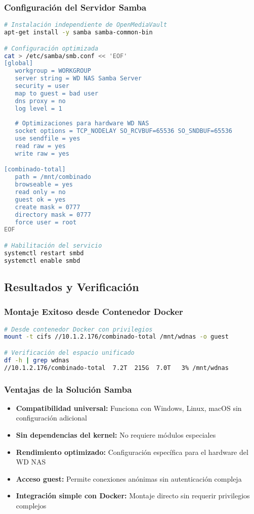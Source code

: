 \documentclass[12pt, a4paper]{article}
\begin{document}
\subsubsection{Configuración del Servidor Samba}
\begin{lstlisting}[language=bash, caption=Configuración Samba optimizada para WD NAS]
# Instalación independiente de OpenMediaVault
apt-get install -y samba samba-common-bin

# Configuración optimizada
cat > /etc/samba/smb.conf << 'EOF'
[global]
   workgroup = WORKGROUP
   server string = WD NAS Samba Server
   security = user
   map to guest = bad user
   dns proxy = no
   log level = 1
   
   # Optimizaciones para hardware WD NAS
   socket options = TCP_NODELAY SO_RCVBUF=65536 SO_SNDBUF=65536
   use sendfile = yes
   read raw = yes
   write raw = yes

[combinado-total]
   path = /mnt/combinado
   browseable = yes
   read only = no
   guest ok = yes
   create mask = 0777
   directory mask = 0777
   force user = root
EOF

# Habilitación del servicio
systemctl restart smbd
systemctl enable smbd
\end{lstlisting}

\subsection{Resultados y Verificación}
\label{subsec:resultados_samba}

\subsubsection{Montaje Exitoso desde Contenedor Docker}
\begin{lstlisting}[language=bash, caption=Acceso exitoso al filesystem de 7.2TB]
# Desde contenedor Docker con privilegios
mount -t cifs //10.1.2.176/combinado-total /mnt/wdnas -o guest

# Verificación del espacio unificado
df -h | grep wdnas
//10.1.2.176/combinado-total  7.2T  215G  7.0T   3% /mnt/wdnas
\end{lstlisting}

\subsubsection{Ventajas de la Solución Samba}
\begin{itemize}
    \item \textbf{Compatibilidad universal:} Funciona con Windows, Linux, macOS sin configuración adicional
    \item \textbf{Sin dependencias del kernel:} No requiere módulos especiales
    \item \textbf{Rendimiento optimizado:} Configuración específica para el hardware del WD NAS
    \item \textbf{Acceso guest:} Permite conexiones anónimas sin autenticación compleja
    \item \textbf{Integración simple con Docker:} Montaje directo sin requerir privilegios complejos
\end{itemize}
\end{document}
